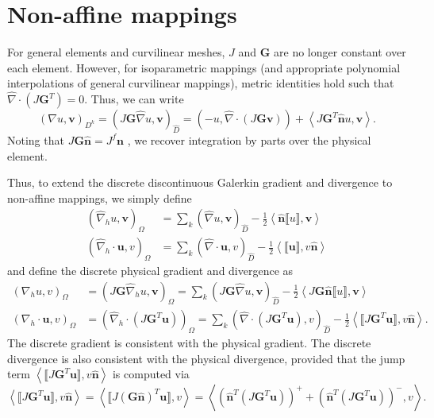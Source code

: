 \documentclass[preprint,10pt]{article}
\theoremstyle{definition}
\theoremstyle{lemma}
\newcommand{\LRp}[1]{\left( #1 \right)}
\newcommand{\LRa}[1]{\left\langle #1 \right\rangle}
\newcommand{\Grad} {\ensuremath{\nabla}}
\newcommand{\jump}[1] {\ensuremath{\llbracket#1\rrbracket}}
\begin{document}
\section{Non-affine mappings}
\label{sec:curv}

For general elements and curvilinear meshes, $J$ and $\bm{G}$ are no longer constant over each element.  However, for isoparametric mappings (and appropriate polynomial interpolations of general curvilinear mappings), metric identities hold \cite{kopriva2006metric} such that $\widehat{\Grad} \cdot \LRp{J\bm{G}^T} = 0$.  Thus, we can write
\[
\LRp{\Grad u,\bm{v}}_{D^k} = \LRp{J\bm{G}\widehat{\Grad} u,\bm{v}}_{\widehat{D}} = \LRp{-u,\widehat{\Grad} \cdot \LRp{J\bm{G}\bm{v}}}  + \LRa{J\bm{G}^T\widehat{\bm{n}} u,\bm{v}}.   
\]
Noting that $J\bm{G}\widehat{\bm{n}} = J^f \bm{n} $ \cite{hesthaven2007nodal}, we recover integration by parts over the physical element.  

Thus, to extend the discrete discontinuous Galerkin gradient and divergence to non-affine mappings, we simply define
\begin{align*}
\LRp{\widehat{\Grad}_h u,\bm{v}}_{\Omega} &= \sum_{k} \LRp{\widehat{\Grad}u,\bm{v}}_{\widehat{D}}  - \frac{1}{2}\LRa{\widehat{\bm{n}} \jump{u},\bm{v}} \\
\LRp{\widehat{\Grad}_h \cdot\bm{u},{v}}_{\Omega} &= \sum_{k} \LRp{\widehat{\Grad}\cdot \bm{u},{v}}_{\widehat{D}}  - \frac{1}{2}\LRa{\jump{\bm{u}},v\widehat{\bm{n}}} 
\end{align*}
and define the discrete physical gradient and divergence as
\begin{align*}
\LRp{\Grad_h u,v}_{\Omega} &= \LRp{J\bm{G}\widehat{\Grad}_h u,\bm{v}}_{\Omega} = \sum_{k}\LRp{J\bm{G}\widehat{\Grad}u,\bm{v}}_{\widehat{D}}  - \frac{1}{2}\LRa{J\bm{G}\widehat{\bm{n}} \jump{u},\bm{v}} \\
\LRp{\Grad_h \cdot \bm{u},v}_{\Omega} &= \LRp{\widehat{\Grad}_h\cdot\LRp{J\bm{G}^T\bm{u}}}_{\Omega} = \sum_{k} \LRp{\widehat{\Grad}\cdot \LRp{J\bm{G}^T\bm{u}},{v}}_{\widehat{D}}  - \frac{1}{2}\LRa{\jump{J\bm{G}^T\bm{u}},v\widehat{\bm{n}}}. 
\end{align*}
The discrete gradient is consistent with the physical gradient.  The discrete divergence is also consistent with the physical divergence, provided that the jump term $\LRa{\jump{J\bm{G}^T\bm{u}},v\widehat{\bm{n}}}$ is computed via
\[
\LRa{\jump{J\bm{G}^T\bm{u}},v\widehat{\bm{n}}} = \LRa{\jump{J\LRp{\bm{G}\widehat{\bm{n}}}^T\bm{u}},v} = \LRa{\LRp{\widehat{\bm{n}}^T\LRp{J{\bm{G}}^T\bm{u}}}^+ + \LRp{\widehat{\bm{n}}^T\LRp{J{\bm{G}}^T\bm{u}}}^-,v}.  
\]
\end{document}
